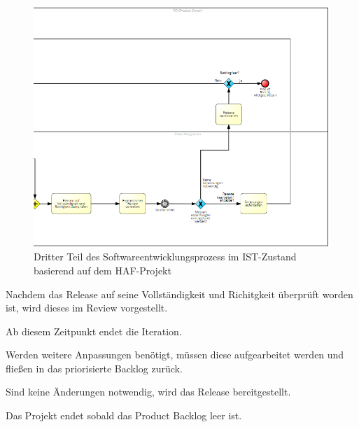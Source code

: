 \begin{figure}[h]
    \centering
    \includegraphics[scale=0.5]{Bilder/IST-Prozess_third Part.png}
    \caption{Dritter Teil des Softwareentwicklungsprozess im IST-Zustand basierend auf dem HAF-Projekt}
\end{figure}

Nachdem das Release auf seine Vollständigkeit und Richitgkeit überprüft worden ist, wird dieses im Review vorgestellt. 

Ab diesem Zeitpunkt endet die Iteration. 

Werden weitere Anpassungen benötigt, müssen diese aufgearbeitet werden und fließen in das priorisierte Backlog zurück.

Sind keine Änderungen notwendig, wird das Release bereitgestellt. 

Das Projekt endet sobald das Product Backlog leer ist.






